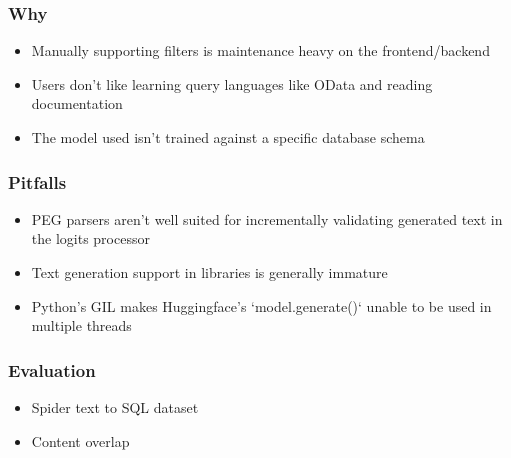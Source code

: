 \documentclass{beamer}
\begin{document}
\begin{frame}
\frametitle{Why}

\begin{itemize}[<+->]
  \item Manually supporting filters is maintenance heavy on the frontend/backend
  \item Users don't like learning query languages like OData and reading documentation
  \item The model used isn't trained against a specific database schema
\end{itemize}

\end{frame}

\begin{frame}
\frametitle{Pitfalls}

\begin{itemize}[<+->]
  \item PEG parsers aren't well suited for incrementally validating generated text in the logits processor
  \item Text generation support in libraries is generally immature
  \item Python's GIL makes Huggingface's `model.generate()` unable to be used in multiple threads
\end{itemize}

\end{frame}

\begin{frame}
\frametitle{Evaluation}

\begin{itemize}[<+->]
  \item Spider text to SQL dataset
  \item Content overlap
\end{itemize}

\end{frame}
\end{document}
